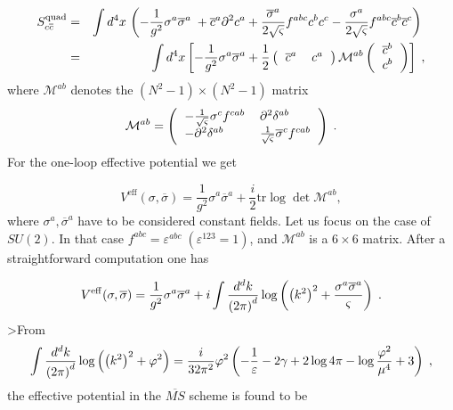 \documentclass[a4paper,12pt]{article}
\begin{document}
\begin{eqnarray}
S_{c\overline{c}}^{\mathrm{quad}} &=&\int d^{4}x\,\left( -\frac{1}{g^{2}}%
\sigma ^{a}\overline{\sigma }^{a}\;+\overline{c}^{a}\partial ^{2}c^{a}+\frac{%
\overline{\sigma }^{a}}{2\sqrt{\varsigma }}f^{abc}c^{b}c^{c}-\frac{\sigma
^{a}}{2\sqrt{\varsigma }}f^{abc}\overline{c}^{b}\overline{c}^{c}\right) \; 
\nonumber \\
&=&\int d^{4}x\left[ -\frac{1}{g^{2}}\sigma ^{a}\overline{\sigma }^{a}+\frac{%
1}{2}\left( 
\begin{tabular}{ll}
$\overline{c}^{a}$ & $c^{a}$%
\end{tabular}
\right) \mathcal{M}^{ab}\left( 
\begin{tabular}{l}
$\overline{c}^{b}$ \\ 
$c^{b}$%
\end{tabular}
\right) \right] \;,  \label{scc}
\end{eqnarray}
where $\mathcal{M}^{ab}$ denotes the $\left( N^{2}-1\right) \times \left(
N^{2}-1\right) $ matrix
\begin{equation}
\mathcal{M}^{ab}=\left( 
\begin{tabular}{ll}
$-\frac{1}{\sqrt{\varsigma }}\sigma ^{c}f^{cab}$ & $\partial ^{2}\delta
^{ab} $ \\ 
$-\partial ^{2}\delta ^{ab}$ & $\frac{1}{\sqrt{\varsigma }}\overline{\sigma }%
^{c}f^{cab}$%
\end{tabular}
\right) \;.  \label{mab}
\end{equation}
For the one-loop effective potential we get

\begin{equation}
V^{\mathrm{eff}}(\sigma ,\overline{\sigma })=\frac{1}{g^{2}}\sigma ^{a}%
\overline{\sigma }^{a}+\frac{i}{2}\mathrm{tr\log \det }\mathcal{M}^{ab},
\label{vss}
\end{equation}
where $\sigma ^{a},\overline{\sigma }^{a}$ have to be considered constant
fields. Let us focus on the case of $SU(2).$ In that case $%
f^{abc}=\varepsilon ^{abc}\;(\varepsilon ^{123}=1)$, and $\mathcal{M}^{ab}$
is a $6\times 6$ matrix. After a straightforward computation one has

\begin{equation}
V^{\mathrm{eff}}(\sigma ,\overline{\sigma })=\frac{1}{g^{2}}\sigma ^{a}%
\overline{\sigma }^{a}+i\int \frac{d^{d}k}{\left( 2\pi \right) ^{d}}\log
\left( \left( k^{2}\right) ^{2}+\frac{\sigma ^{a}\overline{\sigma }^{a}}{%
\varsigma }\right) \;.  \label{vss1}
\end{equation}
>From 
\begin{equation}
\int \frac{d^{d}k}{\left( 2\pi \right) ^{d}}\log \left( \left( k^{2}\right)
^{2}+\varphi ^{2}\right) =\frac{i}{32\pi ^{2}}\varphi ^{2}\left( -\frac{1}{%
\varepsilon }-2\gamma +2\log 4\pi -\log \frac{\varphi ^{2}}{\mu ^{4}}%
+3\right) \;,  \label{igh}
\end{equation}
the effective potential in the $\overline{MS}$ scheme is found to be
\end{document}
